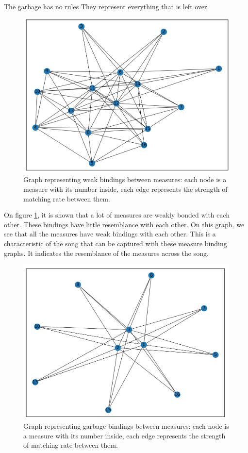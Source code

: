 The garbage has no rules They represent everything that is left over.

\begin{figure}[H]
	\includegraphics[width=\linewidth]{Fotos/bindings_graph/Godfather_16_weak.png}
	\caption{Graph representing weak bindings between measures: each node is a measure with its number inside, each edge represents the strength of matching rate between them.}
	\label{fig:GF_weak_graph}
\end{figure}

On figure \ref{fig:GF_weak_graph}, it is shown that a lot of measures are weakly bonded with each other. These bindings have little resemblance with each other. On this graph, we see that all the measures have weak bindings with each other. This is a characteristic of the song that can be captured with these measure binding graphs. It indicates the resemblance of the measures across the song.

\begin{figure}[H]
	\includegraphics[width=\linewidth]{Fotos/bindings_graph/Godfather_16_garbage.png}
	\caption{Graph representing garbage bindings between measures: each node is a measure with its number inside, each edge represents the strength of matching rate between them.}
	\label{fig:GF_garbage_graph}
\end{figure}


